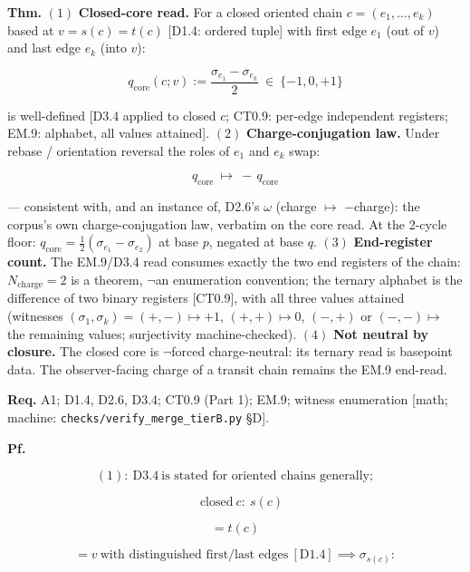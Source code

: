 \begin{theorem}\label{tag:EM-9a}
\textbf{Thm.} $(1)$ \textbf{Closed-core read.} For a closed oriented chain $c=(e_1,\dots,e_k)$ based at $v=s(c)=t(c)$ [D1.4: ordered tuple] with first edge $e_1$ (out of $v$) and last edge $e_k$ (into $v$):

\[
q_{\mathrm{core}}(c;v):=\frac{\sigma_{e_1}-\sigma_{e_k}}{2}\ \in\ \{-1,0,+1\}
\]

is well-defined [D3.4 applied to closed $c$; CT0.9: per-edge independent registers; EM.9: alphabet, all values attained]. $(2)$ \textbf{Charge-conjugation law.} Under rebase / orientation reversal the roles of $e_1$ and $e_k$ swap:

\[
q_{\mathrm{core}}\ \mapsto\ -\,q_{\mathrm{core}}
\]

— consistent with, and an instance of, D2.6's $\omega$ (charge $\mapsto$ $-$charge): the corpus's own charge-conjugation law, verbatim on the core read. At the 2-cycle floor: $q_{\mathrm{core}}=\tfrac12(\sigma_{e_1}-\sigma_{e_2})$ at base $p$, negated at base $q$. $(3)$ \textbf{End-register count.} The EM.9/D3.4 read consumes exactly the two end registers of the chain: $N_{\mathrm{charge}}=2$ is a theorem, $\neg$an enumeration convention; the ternary alphabet is the difference of two binary registers [CT0.9], with all three values attained (witnesses $(\sigma_1,\sigma_k)=(+,-)\mapsto+1$, $(+,+)\mapsto0$, $(-,+)$ or $(-,-)\mapsto$ the remaining values; surjectivity machine-checked). $(4)$ \textbf{Not neutral by closure.} The closed core is $\neg$forced charge-neutral: its ternary read is basepoint data. The observer-facing charge of a transit chain remains the EM.9 end-read.

\textbf{Req.} A1; D1.4, D2.6, D3.4; CT0.9 (Part 1); EM.9; witness enumeration [math; machine: \texttt{checks/\allowbreak{}verify\_\allowbreak{}merge\_\allowbreak{}tierB.py} §D].

\textbf{Pf.}

\[
(1):\ \mathrm{D3.4}\ \text{is stated for oriented chains generally};
\]

\[
\quad \text{closed}\ c:\ s(c)
\]

\[
= t(c)
\]

\[
= v\ \text{with distinguished first/last edges}\ [\mathrm{D1.4}]\implies\sigma_{s(c)}:
\]


\end{theorem}
